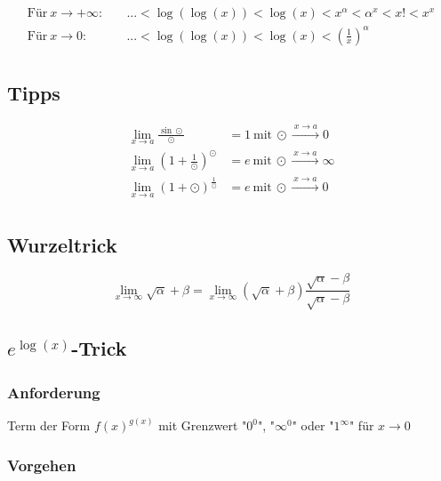 \documentclass[11pt]{article}
\begin{document}
\begin{equation*}
\begin{split}
	\text{F{\"u}r}\ x \to +\infty:\quad & ... < \log(\log(x)) < \log(x) < x^\alpha < \alpha^x < x! < x^x \\
	\text{F{\"u}r}\ x \to 0:\quad & ... < \log(\log(x)) < \log(x) < (\frac{1}{x})^\alpha \\
\end{split}
\end{equation*}

\subsection{Tipps}

\begin{equation*}
\begin{split}
	\lim_{x \to a} \frac{\sin \odot}{\odot} & = 1\ \text{mit}\ \odot \xrightarrow{\: x \to a \: } 0 \\ 
	\lim_{x \to a} (1 + \frac{1}{\odot})^\odot & = e\ \text{mit}\ \odot \xrightarrow{\: x \to a \: } \infty \\ 
	\lim_{x \to a} (1 + \odot)^\frac{1}{\odot} & = e\ \text{mit}\ \odot \xrightarrow{\: x \to a \: } 0 \\ 
\end{split}
\end{equation*}

\subsection{Wurzeltrick}

\begin{equation*}
	\lim_{x\to\infty} \sqrt{\alpha}+\beta = \lim_{x\to\infty}(\sqrt{\alpha}+\beta)\frac{\sqrt{\alpha}-\beta}{\sqrt{\alpha}-\beta}
\end{equation*}

\subsection{$e^{\log(x)}$-Trick}

\subsubsection*{Anforderung}

Term der Form $f(x)^{g(x)}$ mit Grenzwert "$0^0$", "$\infty^0$" oder "$1^\infty$" f{\"u}r $x \to 0$

\subsubsection*{Vorgehen}
\end{document}

